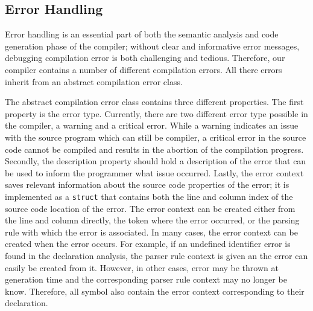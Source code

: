\subsection{Error Handling}
\label{sec:implementation_semanticAnalayis_errorHandling}
Error handling is an essential part of both the semantic analysis and code generation phase of the compiler; without clear and informative error messages, debugging compilation error is both challenging and tedious. Therefore, our compiler contains a number of different compilation errors. All there errors inherit from an abstract compilation error class. 

The abstract compilation error class contains three different properties. The first property is the error type. Currently, there are two different error type possible in the compiler, a warning and a critical error. While a warning indicates an issue with the source program which can still be compiler, a critical error in the source code cannot be compiled and results in the abortion of the compilation progress. Secondly, the description property should hold a description of the error that can be used to inform the programmer what issue occurred. Lastly, the error context saves relevant information about the source code properties of the error; it is implemented as a \texttt{struct} that contains both the line and column index of the source code location of the error. The error context can be created either from the line and column directly, the token where the error occurred, or the parsing rule with which the error is associated. In many cases, the error context can be created when the error occurs. For example, if an undefined identifier error is found in the declaration analysis, the parser rule context is given an the error can easily be created from it. However, in other cases, error may be thrown at generation time and the corresponding parser rule context may no longer be know. Therefore, all symbol also contain the error context corresponding to their declaration. 

